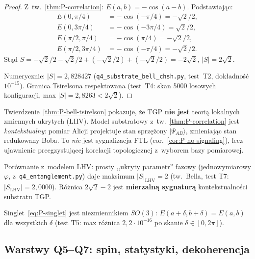 \begin{proof}
Z~tw.~\ref{thm:P-correlation}: $E(a,b) = -\cos(a-b)$. Podstawiając:
\begin{align*}
  E(0, \pi/4) &= -\cos(-\pi/4) = -\sqrt{2}/2, \\
  E(0, 3\pi/4) &= -\cos(-3\pi/4) = \sqrt{2}/2, \\
  E(\pi/2, \pi/4) &= -\cos(\pi/4) = -\sqrt{2}/2, \\
  E(\pi/2, 3\pi/4) &= -\cos(-\pi/4) = -\sqrt{2}/2.
\end{align*}
Stąd $S = -\sqrt{2}/2 - \sqrt{2}/2 + (-\sqrt{2}/2) + (-\sqrt{2}/2)
= -2\sqrt{2}$, $|S| = 2\sqrt{2}$.

Numerycznie: $|S| = 2{,}828427$ (\texttt{q4\_substrate\_bell\_chsh.py},
test~T2, dokładność $10^{-15}$). Granica Tsirelsona respektowana
(test~T4: skan 5000 losowych konfiguracji, max $|S| = 2{,}8263
< 2\sqrt{2}$).
\end{proof}

\begin{remark}\label{rem:P-contextual}
Twierdzenie~\ref{thm:P-bell-tsirelson} pokazuje, że TGP \textbf{nie jest}
teorią lokalnych zmiennych ukrytych (LHV). Model substratowy
z~tw.~\ref{thm:P-correlation} jest \emph{kontekstualny}:
pomiar Alicji projektuje stan sprzężony $|\Psi_{AB}\rangle$,
zmieniając stan redukowany Boba. To \emph{nie} jest sygnalizacja
FTL (cor.~\ref{cor:P-no-signaling}), lecz ujawnienie
preegzystującej korelacji topologicznej z~wyborem bazy pomiarowej.

Porównanie z~modelem LHV: prosty ,,ukryty parametr'' fazowy
(jednowymiarowy $\varphi$, z~\texttt{q4\_entanglement.py})
daje maksimum $|S|_{\mathrm{LHV}} = 2$
(tw.~Bella, test T7: $|S_{\mathrm{LHV}}| = 2{,}0000$).
Różnica $2\sqrt{2} - 2$ jest \textbf{mierzalną sygnaturą}
kontekstualności substratu TGP.
\end{remark}

\begin{corollary}
Singlet~\eqref{eq:P-singlet} jest niezmiennikiem $SO(3)$:
$E(a + \delta, b + \delta) = E(a, b)$ dla wszystkich $\delta$
(test T5: max różnica $2{,}2 \cdot 10^{-16}$ po skanie $\delta \in [0, 2\pi]$).
\end{corollary}

\subsection{Warstwy Q5--Q7: spin, statystyki, dekoherencja}%
\label{app:P-Q5-Q7}

